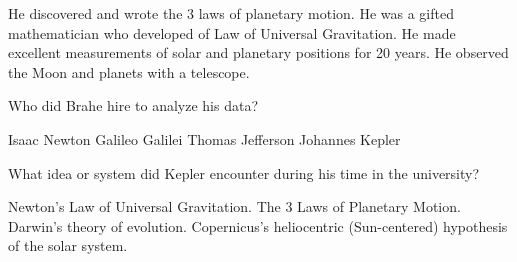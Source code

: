 \documentclass[addpoints]{exam}
\begin{document}
\begin{questions}
\begin{choices}
    \choice He discovered and wrote the 3 laws of planetary motion.
    \choice He was a gifted mathematician who developed of Law of Universal Gravitation.
    \correctchoice He made excellent measurements of solar and planetary positions for 20 years. 
    \choice He observed the Moon and planets with a telescope.
\end{choices}




\question
Who did Brahe hire to analyze his data?

\begin{choices}
    \choice Isaac Newton
    \choice Galileo Galilei
    \choice Thomas Jefferson
    \correctchoice Johannes Kepler
\end{choices}





\question
What idea or system did Kepler encounter during his time in the university?

\begin{choices}
    \choice Newton's Law of Universal Gravitation.
    \choice The 3 Laws of Planetary Motion.
    \choice Darwin's theory of evolution.
    \correctchoice Copernicus's heliocentric (Sun-centered) hypothesis of the solar system.
\end{choices}



\end{questions}
\end{document}
